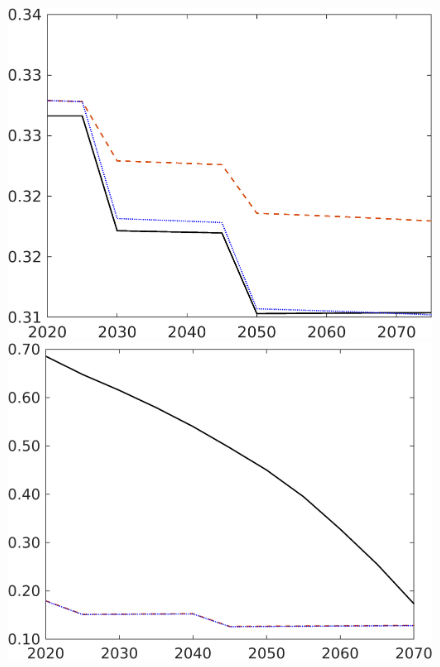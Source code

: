 \begin{figure}[h!!]
\begin{minipage}[]{0.32\textwidth}
	\end{minipage}
	\begin{minipage}[]{0.32\textwidth}
		\includegraphics[width=1\textwidth]{../../codding_model/own_basedOnFried/optimalPol_190722_tidiedUp/figures/all_July22/hl_CompEffOPT_T_NoTaus_pol4_spillover0_noskill0_sep1_xgrowth0_etaa0.79_lgd0_lff0.png}
	\end{minipage}
	\begin{minipage}[]{0.32\textwidth}
		\includegraphics[width=1\textwidth]{../../codding_model/own_basedOnFried/optimalPol_190722_tidiedUp/figures/all_July22/gAagg_CompEffOPT_T_NoTaus_pol4_spillover0_noskill0_sep1_xgrowth0_etaa0.79_lgd0_lff0.png}

\end{minipage}
\end{figure}
